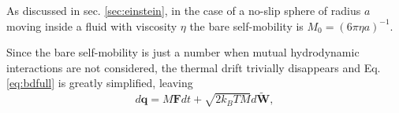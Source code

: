 \documentclass[twoside,openright,titlepage,numbers=noenddot,%
headinclude,footinclude,cleardoublepage=empty,abstract=on,
BCOR=5mm,fontsize=11pt, dvipsnames, paper=b5
]{scrreprt}
\renewcommand{\vec}[1]{\bm{#1}}
\newcommand{\dt}{\delta t}
\newcommand{\kT}{k_B T}
\newcommand{\noise}{\widetilde{W}}
\newcommand{\ppos}{q}
\begin{document}
As discussed in sec. \ref{sec:einstein}, in the case of a no-slip sphere of radius $a$ moving inside a fluid with viscosity $\eta$ the bare self-mobility is $M_0 = (6\pi\eta a)^{-1}$.

Since the bare self-mobility is just a number when mutual hydrodynamic interactions are not considered, the thermal drift trivially disappears and Eq. \eqref{eq:bdfull} is greatly simplified, leaving
\begin{equation}
  \label{eq:bd}
  d\vec{\ppos} = M\vec{F}dt + \sqrt{2\kT M}d\vec{\noise},
\end{equation}


\end{document}
